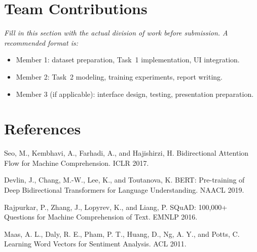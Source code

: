 \documentclass[10pt]{article}
\begin{document}
\section{Team Contributions}
\textit{Fill in this section with the actual division of work before submission. A recommended format is:}
\begin{itemize}
\item Member 1: dataset preparation, Task~1 implementation, UI integration.
\item Member 2: Task~2 modeling, training experiments, report writing.
\item Member 3 (if applicable): interface design, testing, presentation preparation.
\end{itemize}

\section*{References}
Seo, M., Kembhavi, A., Farhadi, A., and Hajishirzi, H. Bidirectional Attention Flow for Machine Comprehension. ICLR 2017.

Devlin, J., Chang, M.-W., Lee, K., and Toutanova, K. BERT: Pre-training of Deep Bidirectional Transformers for Language Understanding. NAACL 2019.

Rajpurkar, P., Zhang, J., Lopyrev, K., and Liang, P. SQuAD: 100,000+ Questions for Machine Comprehension of Text. EMNLP 2016.

Maas, A. L., Daly, R. E., Pham, P. T., Huang, D., Ng, A. Y., and Potts, C. Learning Word Vectors for Sentiment Analysis. ACL 2011.
\end{document}
